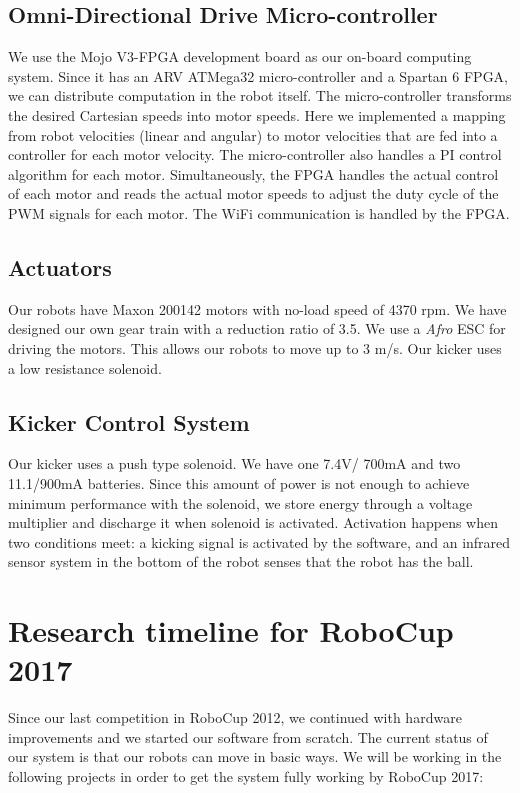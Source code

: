 \documentclass[]{llncs}
\newcommand{\TODO}[1]{{\textcolor{blue}{ToDo: {#1}}}}
\begin{document}


\subsection{Omni-Directional Drive Micro-controller}
We use the Mojo V3-FPGA development board as our on-board computing system. Since it has an ARV ATMega32 micro-controller and a Spartan 6 FPGA, we can distribute computation in the robot itself. The micro-controller transforms the desired Cartesian speeds into motor speeds. Here we implemented a mapping from robot velocities (linear and angular) to motor velocities that are fed into a controller for each motor velocity. The micro-controller also handles a PI control algorithm for each motor. Simultaneously, the FPGA handles the actual control of each motor and reads the actual motor speeds to adjust the duty cycle of the PWM signals for each motor. The WiFi communication is handled by the FPGA. 


\subsection{Actuators}
Our robots have Maxon 200142 motors with no-load speed of 4370 rpm. We have designed our own gear train with a reduction ratio of 3.5. We use a \textit{Afro} ESC for driving the motors. This allows our robots to move up to 3 m/s. Our kicker uses a low resistance solenoid.



\subsection{Kicker Control System}
Our kicker uses a push type solenoid. We have one 7.4V/ 700mA and two 11.1/900mA batteries. Since this amount of power is not enough to achieve minimum performance with the solenoid, we store energy through a voltage multiplier and discharge it when solenoid is activated. Activation happens when two conditions meet: a kicking signal is activated by the software, and an infrared sensor system in the bottom of the robot senses that the robot has the ball. 

\section{Research timeline for RoboCup 2017}
Since our last competition in RoboCup 2012, we continued with hardware improvements and we started our software from scratch. The current status of our system is that our robots can move in basic ways. We will be working in the following projects in order to get the system fully working by RoboCup 2017:
\end{document}
